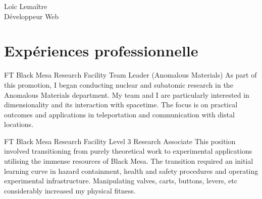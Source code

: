 \documentclass[10pt]{article} %
\begin{document}
\begin{paracol}{2} %


  \parbox[top][0.12\textheight][c]{\linewidth}{ %
    \vspace{-0.04\textheight} %
    \centering %
    {\sffamily\Huge Loïc Lemaître}\\\medskip %
    {\Huge\color{headings}\cvtextfont Développeur Web}
  }


  \section{Expériences professionnelle}





  {FT} %
  {Black Mesa Research Facility} %
  {Team Leader (Anomalous Materials)} %
  {As part of this promotion, I began conducting nuclear and subatomic research in the Anomalous Materials department. My team and I are particularly interested in dimensionality and its interaction with spacetime. The focus is on practical outcomes and applications in teleportation and communication with distal locations.} %


  {FT} %
  {Black Mesa Research Facility} %
  {Level 3 Research Associate} %
  {This position involved transitioning from purely theoretical work to experimental applications utilising the immense resources of Black Mesa. The transition required an initial learning curve in hazard containment, health and safety procedures and operating experimental infrastructure. Manipulating valves, carts, buttons, levers, etc considerably increased my physical fitness.}  %


\end{paracol}
\end{document}
